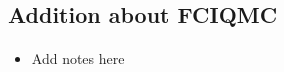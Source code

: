 \documentclass[%
oneside,                 %
final,                   %
10pt]{article}
\begin{document}
\noindent



\subsection{Addition about FCIQMC}

\paragraph{}
\begin{itemize}
\item Add notes here
\end{itemize}

\noindent







\end{document}
